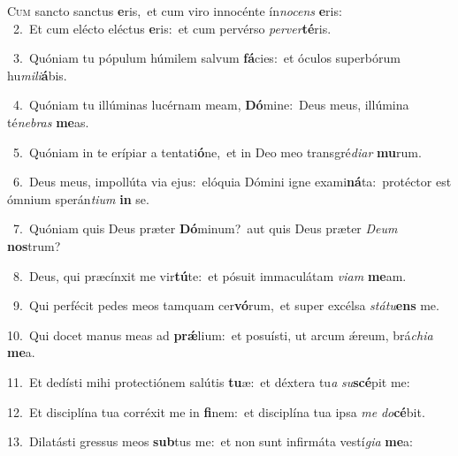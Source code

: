 \lettrine{\initial\textcolor{\initialcolor}{C}}{um} sancto sanctus \textbf{e}\-ris,~\star et cum viro innocénte ín\-\textit{no}\-\textit{cens} \textbf{e}\-ris:\\
{\numbfont\textcolor{\numbcolor}{~2.}}~Et cum elécto eléctus \textbf{e}\-ris:~\star et cum pervérso \textit{per}\-\textit{ver}\textbf{té}ris.\par
{\numbfont\textcolor{\numbcolor}{~3.}}~Quóniam tu pópulum húmilem salvum \textbf{fá}\-cies:~\star et óculos superbórum hu\-\textit{mi}\-\textit{li}\textbf{á}bis.\par
{\numbfont\textcolor{\numbcolor}{~4.}}~Quóniam tu illúminas lucérnam meam, \textbf{Dó}\-mine:~\star Deus meus, illúmina té\-\textit{ne}\-\textit{bras} \textbf{me}\-as.\par
{\numbfont\textcolor{\numbcolor}{~5.}}~Quóniam in te erípiar a tentati\-\textbf{ó}\-ne,~\star et in Deo meo transgré\-\textit{di}\-\textit{ar} \textbf{mu}\-rum.\par
{\numbfont\textcolor{\numbcolor}{~6.}}~Deus meus, impollúta via ejus:~\dagger elóquia Dómini igne exami\-\textbf{ná}\-ta:~\star protéctor est ómnium sperán\-\textit{ti}\-\textit{um} \textbf{in} se.\par
{\numbfont\textcolor{\numbcolor}{~7.}}~Quóniam quis Deus præter \textbf{Dó}\-minum?~\star aut quis Deus præter \textit{De}\-\textit{um} \textbf{nos}\-trum?\par
{\numbfont\textcolor{\numbcolor}{~8.}}~Deus, qui præcínxit me vir\-\textbf{tú}\-te:~\star et pósuit immaculátam \textit{vi}\-\textit{am} \textbf{me}\-am.\par
{\numbfont\textcolor{\numbcolor}{~9.}}~Qui perfécit pedes meos tamquam cer\-\textbf{vó}\-rum,~\star et super excélsa \textit{stá}\-\textit{tu}\textbf{ens} me.\par
{\numbfont\textcolor{\numbcolor}{10.}}~Qui docet manus meas ad \textbf{prǽ}\-lium:~\star et posuísti, ut arcum ǽreum, brá\-\textit{chi}\-\textit{a} \textbf{me}\-a.\par
{\numbfont\textcolor{\numbcolor}{11.}}~Et dedísti mihi protectiónem salútis \textbf{tu}\-æ:~\star et déxtera tu\textit{a} \textit{su}\-\textbf{scé}pit me:\par
{\numbfont\textcolor{\numbcolor}{12.}}~Et disciplína tua corréxit me in \textbf{fi}\-nem:~\star et disciplína tua ipsa \textit{me} \textit{do}\-\textbf{cé}bit.\par
{\numbfont\textcolor{\numbcolor}{13.}}~Dilatásti gressus meos \textbf{sub}\-tus me:~\star et non sunt infirmáta vestí\-\textit{gi}\-\textit{a} \textbf{me}\-a:\par
